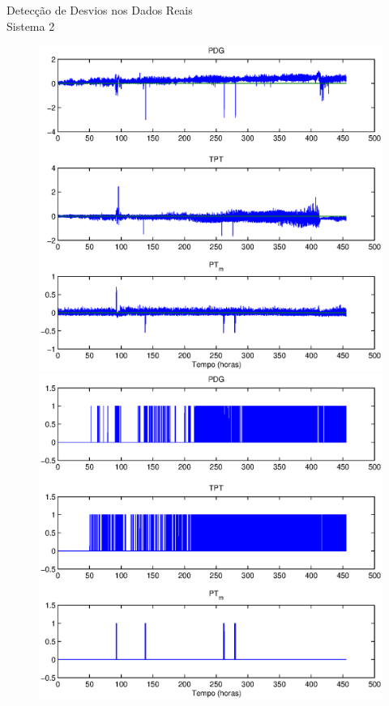 \documentclass{beamer}
\begin{document}
\begin{frame}{Detecção de Desvios nos Dados Reais\\Sistema 2}
    \begin{figure}[bt]
        \centering\hspace*{-15pt}
        \includegraphics[trim=1.5cm .7cm 1.1cm .7cm,clip=true,width=.55\textwidth]{figuras/real_sys2_res_d1.eps}
        \includegraphics[trim=1.5cm .7cm 1.1cm .7cm,clip=true,width=.55\textwidth]{figuras/real_sys2_sprt_d1.eps}
    \end{figure}
\end{frame}
\end{document}
